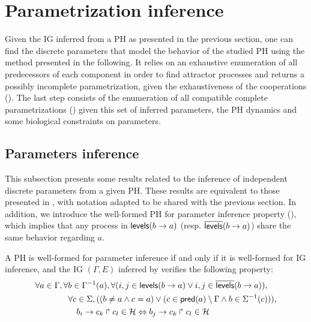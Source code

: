 \section{Parametrization inference}\label{sec:infer-K}


Given the IG inferred from a PH as presented in the previous section, one can find the discrete parameters
that model the behavior of the studied PH using the method presented in the following.
It relies on an exhaustive enumeration of all predecessors of each component in order to find attractor processes
and returns a possibly incomplete parametrization, given the exhaustiveness of the cooperations ().
The last step consists of the enumeration of all compatible complete parametrizations () given this
set of inferred parameters, the PH dynamics and some biological constraints on parameters.

\subsection{Parameters inference}\label{ssec:infer-K}

This subsection presents some results related to the inference of independent discrete parameters from a given PH.
These results are equivalent to those presented in \cite{PMR10-TCSB}, with notation adapted to be shared with the previous section.
In addition, we introduce the well-formed PH for parameter inference property (),
which implies that %
any process in $\mathsf{levels}(b\rightarrow a)$ (resp. $\overline{\mathsf{levels}}(b\rightarrow a)$) share the same behavior
regarding $a$.

\begin{property}\label{pro:wf-ph-K}
A PH is well-formed for parameter inference if and only if
it is well-formed for IG inference, and
the IG $(\Gamma, E)$ inferred by 
verifies the following property:
\begin{align*}
  \begin{split}
  \forall a \in \Gamma&, \forall b\in \Gamma^{-1}(a),
          \forall (i,j\in\mathsf{levels}(b\rightarrow a) \vee i,j\in\overline{\mathsf{levels}}(b\rightarrow a)), \\
  & \quad \forall c \in \Sigma, ( (b\neq a\wedge c=a) \vee (c\in\mathsf{pred}(a)\setminus \Gamma \wedge b\in\Sigma^{-1}(c))), \\
  & \qquad
                          b_i\rightarrow c_k\Rsh c_l\in\mathcal{H} \Leftrightarrow
                                  b_j\rightarrow c_k\Rsh c_l\in\mathcal{H}
  \end{split}
\end{align*}
\end{property}

